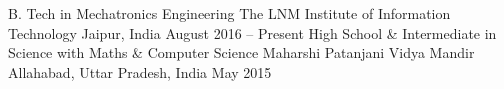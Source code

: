 \begin{cventries}
  \cventry
    {B. Tech in Mechatronics Engineering}
    {The LNM Institute of Information Technology}
    {Jaipur, India}
    {August 2016 – Present}
    {}
    \cventry
    {High School \& Intermediate in Science with Maths \& Computer Science}
	{Maharshi Patanjani Vidya Mandir}
	{Allahabad, Uttar Pradesh, India}
	{May 2015}
	{}
\end{cventries}
